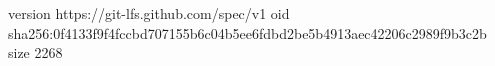 version https://git-lfs.github.com/spec/v1
oid sha256:0f4133f9f4fccbd707155b6c04b5ee6fdbd2be5b4913aec42206c2989f9b3c2b
size 2268
